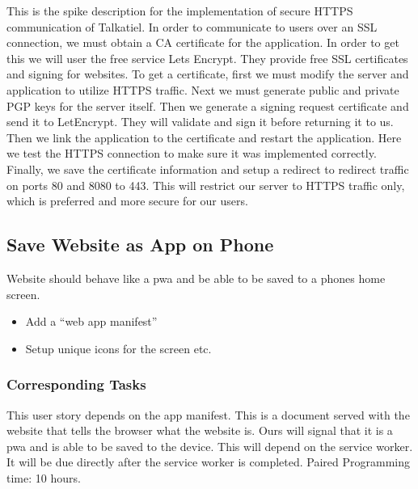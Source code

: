 \documentclass[12pt]{article}
\begin{document}
This is the spike description for the implementation of secure HTTPS communication of Talkatiel.  In order to communicate to users over an SSL connection, we must obtain a CA certificate for the application.  In order to get this we will user the free service Lets Encrypt.  They provide free SSL certificates and signing for websites.  To get a certificate, first we must modify the server and application to utilize HTTPS traffic.  Next we must generate public and private PGP keys for the server itself.  Then we generate a signing request certificate and send it to LetEncrypt.  They will validate and sign it before returning it to us.  Then we link the application to the certificate and restart the application.  Here we test the HTTPS connection to make sure it was implemented correctly.  Finally, we save the certificate information and setup a redirect to redirect traffic on ports 80 and 8080 to 443.  This will restrict our server to HTTPS traffic only, which is preferred and more secure for our users.


\subsection{Save Website as App on Phone}
Website should behave like a pwa and be able to be saved to a phones home screen.
\begin{itemize}
  \item Add a “web app manifest”
  \item Setup unique icons for the screen etc.
\end{itemize}
\subsubsection{Corresponding Tasks}
	This user story depends on the app manifest.  This is a document served with the website that tells the browser what the website is.  Ours will signal that it is a pwa and is able to be saved to the device.  This will depend on the service worker.  It will be due directly after the service worker is completed. Paired Programming time: 10 hours.
\end{document}
